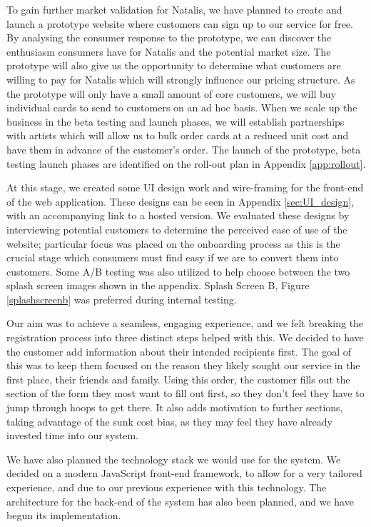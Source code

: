 \documentclass[10pt,a4paper]{article}
\begin{document}
To gain further market validation for Natalis, we have planned to create and launch a prototype website where customers can sign up to our service for free. By analysing the consumer response to the prototype, we can discover the enthusiasm consumers have for Natalis and the potential market size. The prototype will also give us the opportunity to determine what customers are willing to pay for Natalis which will strongly influence our pricing structure. As the prototype will only have a small amount of core customers, we will buy individual cards to send to customers on an ad hoc basis. When we scale up the business in the beta testing and launch phases, we will establish partnerships with artists which will allow us to bulk order cards at a reduced unit cost and have them in advance of the customer's order. The launch of the prototype, beta testing launch phases are identified on the roll-out plan in Appendix \ref{app:rollout}.

At this stage, we created some UI design work and wire-framing for the front-end of the web application. These designs can be seen in Appendix \ref{sec:UI_design}, with an accompanying link to a hosted version. We evaluated these designs by interviewing potential customers to determine the perceived ease of use of the website; particular focus was placed on the onboarding process as this is the crucial stage which consumers must find easy if we are to convert them into customers. Some A/B testing was also utilized to help choose between the two splash screen images shown in the appendix. Splash Screen B, Figure \ref{splashscreenb} was preferred during internal testing. 

Our aim was to achieve a seamless, engaging experience, and we felt breaking the registration process into three distinct steps helped with this. We decided to have the customer add information about their intended recipients first. The goal of this was to keep them focused on the reason they likely sought our service in the first place, their friends and family. Using this order, the customer fills out the section of the form they most want to fill out first, so they don't feel they have to jump through hoops to get there. It also adds motivation to further sections, taking advantage of the sunk cost bias, as they may feel they have already invested time into our system.

We have also planned the technology stack we would use for the system. We decided on a modern JavaScript front-end framework, to allow for a very tailored experience, and due to our previous experience with this technology. The architecture for the back-end of the system has also been planned, and we have begun its implementation.
\end{document}
